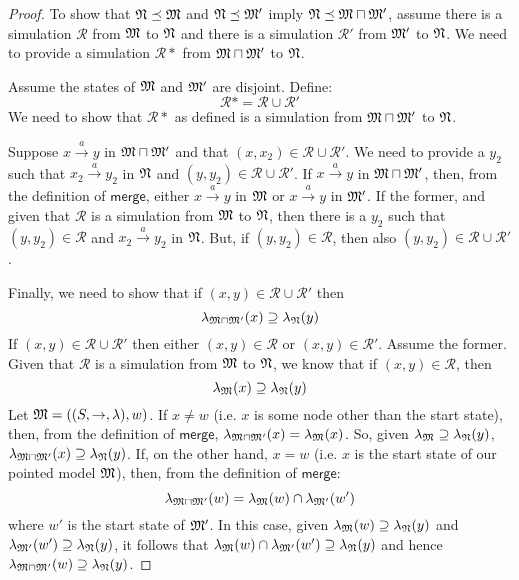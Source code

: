 \begin{proof}
To show that $\frak{N} \preceq \frak{M}$ and $\frak{N} \preceq \frak{M}'$ imply $\frak{N} \preceq \frak{M} \sqcap \frak{M}'$, assume there is a simulation $\mathcal{R}$ from $\frak{M}$ to $\frak{N}$ and there is a simulation $\mathcal{R}'$ from $\frak{M}'$ to $\frak{N}$.
We need to provide a simulation $\mathcal{R}*$ from $\frak{M} \sqcap \frak{M}'$ to $\frak{N}$.

Assume the states of $\frak{M}$ and $\frak{M}'$ are disjoint.
Define:
\[
\mathcal{R}* = \mathcal{R} \cup \mathcal{R}'
\]
We need to show that $\mathcal{R}*$ as defined is a simulation from $\frak{M} \sqcap \frak{M}'$ to $\frak{N}$.

Suppose $x \xrightarrow{a} y$ in $\frak{M} \sqcap \frak{M}'$ and that $(x,x_2) \in \mathcal{R} \cup \mathcal{R}'$.
We need to provide a $y_2$ such that $x_2 \xrightarrow{a} y_2$ in  $\frak{N}$ and $(y,y_2) \in \mathcal{R} \cup \mathcal{R}'$.
If  $x \xrightarrow{a} y$ in $\frak{M} \sqcap \frak{M}'$, then, from the definition of $\mathsf{merge}$, either $x \xrightarrow{a} y$ in $\frak{M}$ or $x \xrightarrow{a} y$ in $\frak{M}'$. If the former, and given that $\mathcal{R}$ is a simulation from $\frak{M}$ to $\frak{N}$, then there is a $y_2$ such that $(y,y_2) \in \mathcal{R}$ and $x_2 \xrightarrow{a} y_2$ in $\frak{N}$. But, if $(y,y_2) \in \mathcal{R}$, then also $(y,y_2) \in \mathcal{R} \cup \mathcal{R}'$.

Finally, we need to show that if $(x,y) \in \mathcal{R} \cup \mathcal{R}'$ then
\[
\lambda_{\frak{M} \sqcap \frak{M}'}(x) \supseteq \lambda_{\frak{N}}(y)
\]
If $(x,y) \in \mathcal{R} \cup \mathcal{R}'$ then either $(x,y) \in \mathcal{R}$ or $(x,y) \in \mathcal{R}'$.
Assume the former.
Given that $\mathcal{R}$ is a simulation from $\frak{M}$ to $\frak{N}$, we know that if $(x,y) \in \mathcal{R}$, then 
\[
\lambda_{\frak{M}}(x) \supseteq \lambda_{\frak{N}}(y)
\]
Let $\frak{M} = ((S,\rightarrow,\lambda),w)$.
If $x \neq w$ (i.e. $x$ is some node other than the start state), then, from the definition of $\mathsf{merge}$, $\lambda_{\frak{M} \sqcap \frak{M}'}(x) = \lambda_{\frak{M}}(x)$.
So, given $\lambda_{\frak{M}} \supseteq \lambda_{\frak{N}}(y)$, $\lambda_{\frak{M} \sqcap \frak{M}'}(x) \supseteq \lambda_{\frak{N}}(y)$.
If, on the other hand, $x = w$ (i.e. $x$ is the start state  of our pointed model $\frak{M}$), then, from the definition of $\mathsf{merge}$:
\[
\lambda_{\frak{M} \sqcap \frak{M}'}(w) = \lambda_{\frak{M}}(w) \cap \lambda_{\frak{M}'}(w')
\]
where $w'$ is the start state  of $\frak{M}'$.
In this case, given $\lambda_{\frak{M}}(w) \supseteq \lambda_{\frak{N}}(y)$ and $\lambda_{\frak{M}'}(w') \supseteq \lambda_{\frak{N}}(y)$, it follows that $\lambda_{\frak{M}}(w) \cap \lambda_{\frak{M}'}(w') \supseteq \lambda_{\frak{N}}(y)$ and hence $\lambda_{\frak{M} \sqcap \frak{M}'}(w) \supseteq \lambda_{\frak{N}}(y)$.

\end{proof}

